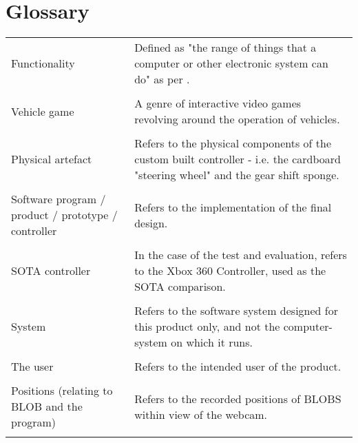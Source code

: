 \section*{Glossary}
\begin{table}[!htbp]
\begin{tabular}{p{2in} p{3.4in}}
Functionality & Defined as "the range of things that a computer or other electronic system can do" as per \parencite{Macmillan2005}.\\
&\\
Vehicle game & A genre of interactive video games revolving around the operation of vehicles.\\
 & \\
Physical artefact & Refers to the physical components of the custom built controller - i.e. the cardboard "steering wheel" and the gear shift sponge.\\
 & \\
Software program / product / prototype / controller & Refers to the implementation of the final design.\\
 & \\
SOTA controller & In the case of the test and evaluation, refers to the Xbox 360 Controller, used as the SOTA comparison.\\
 & \\
System & Refers to the software system designed for this product only, and not the computer-system on which it runs.\\
 & \\
The user & Refers to the intended user of the product.\\
 & \\
Positions (relating to BLOB and the program) & Refers to the recorded positions of BLOBS within view of the webcam.\\
 & \\
 
\end{tabular}
\end{table}